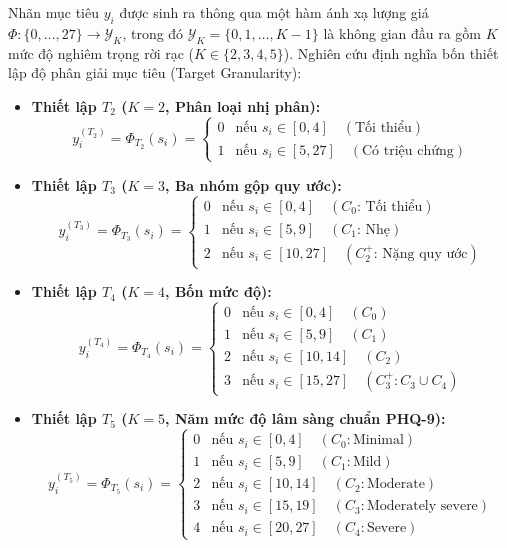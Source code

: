 Nhãn mục tiêu $y_i$ được sinh ra thông qua một hàm ánh xạ lượng giá $\Phi: \{0, \dots, 27\} \to \mathcal{Y}_K$, trong đó $\mathcal{Y}_K = \{0, 1, \dots, K-1\}$ là không gian đầu ra gồm $K$ mức độ nghiêm trọng rời rạc ($K \in \{2, 3, 4, 5\}$). Nghiên cứu định nghĩa bốn thiết lập độ phân giải mục tiêu (Target Granularity):
\begin{itemize}
    \item \textbf{Thiết lập $T_2$ ($K=2$, Phân loại nhị phân):}
    \begin{equation}
        y^{(T_2)}_i = \Phi_{T_2}(s_i) = \begin{cases} 0 & \text{nếu } s_i \in [0, 4] \quad (\text{Tối thiểu}) \\ 1 & \text{nếu } s_i \in [5, 27] \quad (\text{Có triệu chứng}) \end{cases}
    \end{equation}
    \item \textbf{Thiết lập $T_3$ ($K=3$, Ba nhóm gộp quy ước):}
    \begin{equation}
        y^{(T_3)}_i = \Phi_{T_3}(s_i) = \begin{cases} 0 & \text{nếu } s_i \in [0, 4] \quad (C_0\text{: Tối thiểu}) \\ 1 & \text{nếu } s_i \in [5, 9] \quad (C_1\text{: Nhẹ}) \\ 2 & \text{nếu } s_i \in [10, 27] \quad (C_2^+\text{: Nặng quy ước}) \end{cases}
    \end{equation}
    \item \textbf{Thiết lập $T_4$ ($K=4$, Bốn mức độ):}
    \begin{equation}
        y^{(T_4)}_i = \Phi_{T_4}(s_i) = \begin{cases} 0 & \text{nếu } s_i \in [0, 4] \quad (C_0) \\ 1 & \text{nếu } s_i \in [5, 9] \quad (C_1) \\ 2 & \text{nếu } s_i \in [10, 14] \quad (C_2) \\ 3 & \text{nếu } s_i \in [15, 27] \quad (C_3^+: C_3 \cup C_4) \end{cases}
    \end{equation}
    \item \textbf{Thiết lập $T_5$ ($K=5$, Năm mức độ lâm sàng chuẩn PHQ-9):}
    \begin{equation}
        y^{(T_5)}_i = \Phi_{T_5}(s_i) = \begin{cases} 0 & \text{nếu } s_i \in [0, 4] \quad (C_0: \text{Minimal}) \\ 1 & \text{nếu } s_i \in [5, 9] \quad (C_1: \text{Mild}) \\ 2 & \text{nếu } s_i \in [10, 14] \quad (C_2: \text{Moderate}) \\ 3 & \text{nếu } s_i \in [15, 19] \quad (C_3: \text{Moderately severe}) \\ 4 & \text{nếu } s_i \in [20, 27] \quad (C_4: \text{Severe}) \end{cases}
    \end{equation}
\end{itemize}

